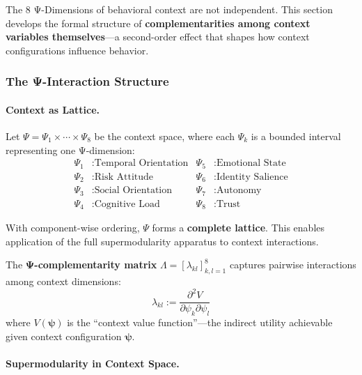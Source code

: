 The 8 Ψ-Dimensions of behavioral context are not independent. This section develops 
the formal structure of \textbf{complementarities among context variables themselves}---a 
second-order effect that shapes how context configurations influence behavior.

\subsubsection{The Ψ-Interaction Structure}

\paragraph{Context as Lattice.}

Let $\Psi = \Psi_1 \times \cdots \times \Psi_8$ be the context space, where each 
$\Psi_k$ is a bounded interval representing one Ψ-dimension:
\begin{align*}
\Psi_1 &: \text{Temporal Orientation} & \Psi_5 &: \text{Emotional State} \\
\Psi_2 &: \text{Risk Attitude} & \Psi_6 &: \text{Identity Salience} \\
\Psi_3 &: \text{Social Orientation} & \Psi_7 &: \text{Autonomy} \\
\Psi_4 &: \text{Cognitive Load} & \Psi_8 &: \text{Trust}
\end{align*}

With component-wise ordering, $\Psi$ forms a \textbf{complete lattice}. This enables 
application of the full supermodularity apparatus to context interactions.

\begin{definition}
\label{def:psi-matrix}
The \textbf{Ψ-complementarity matrix} $\Lambda = [\lambda_{kl}]_{k,l=1}^{8}$ captures 
pairwise interactions among context dimensions:
\begin{equation}
\lambda_{kl} := \frac{\partial^2 V}{\partial \psi_k \partial \psi_l}
\end{equation}
where $V(\boldsymbol{\psi})$ is the ``context value function''---the indirect utility 
achievable given context configuration $\boldsymbol{\psi}$.
\end{definition}

\paragraph{Supermodularity in Context Space.}


